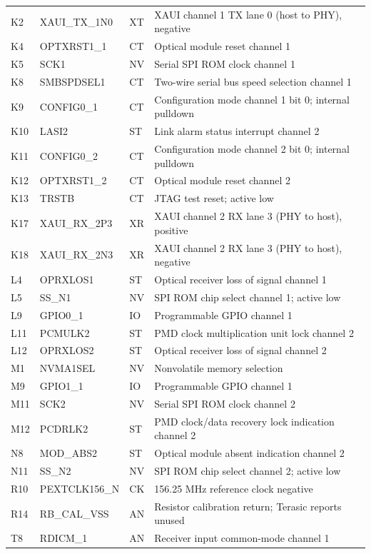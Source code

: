 \documentclass[10pt,a4paper]{article}
\begin{document}
\begin{longtable}{@{}p{12mm}p{44mm}p{10mm}p{91mm}@{}}
K2 & XAUI\_TX\_1N0 & XT & XAUI channel 1 TX lane 0 (host to PHY), negative\\
K4 & OPTXRST1\_1 & CT & Optical module reset channel 1\\
K5 & SCK1 & NV & Serial SPI ROM clock channel 1\\
K8 & SMBSPDSEL1 & CT & Two-wire serial bus speed selection channel 1\\
K9 & CONFIG0\_1 & CT & Configuration mode channel 1 bit 0; internal pulldown\\
K10 & LASI2 & ST & Link alarm status interrupt channel 2\\
K11 & CONFIG0\_2 & CT & Configuration mode channel 2 bit 0; internal pulldown\\
K12 & OPTXRST1\_2 & CT & Optical module reset channel 2\\
K13 & TRSTB & CT & JTAG test reset; active low\\
K17 & XAUI\_RX\_2P3 & XR & XAUI channel 2 RX lane 3 (PHY to host), positive\\
K18 & XAUI\_RX\_2N3 & XR & XAUI channel 2 RX lane 3 (PHY to host), negative\\
L4 & OPRXLOS1 & ST & Optical receiver loss of signal channel 1\\
L5 & SS\_N1 & NV & SPI ROM chip select channel 1; active low\\
L9 & GPIO0\_1 & IO & Programmable GPIO channel 1\\
L11 & PCMULK2 & ST & PMD clock multiplication unit lock channel 2\\
L12 & OPRXLOS2 & ST & Optical receiver loss of signal channel 2\\
M1 & NVMA1SEL & NV & Nonvolatile memory selection\\
M9 & GPIO1\_1 & IO & Programmable GPIO channel 1\\
M11 & SCK2 & NV & Serial SPI ROM clock channel 2\\
M12 & PCDRLK2 & ST & PMD clock/data recovery lock indication channel 2\\
N8 & MOD\_ABS2 & ST & Optical module absent indication channel 2\\
N11 & SS\_N2 & NV & SPI ROM chip select channel 2; active low\\
R10 & PEXTCLK156\_N & CK & 156.25 MHz reference clock negative\\
R14 & RB\_CAL\_VSS & AN & Resistor calibration return; Terasic reports unused\\
T8 & RDICM\_1 & AN & Receiver input common-mode channel 1\\

\end{longtable}
\end{document}
